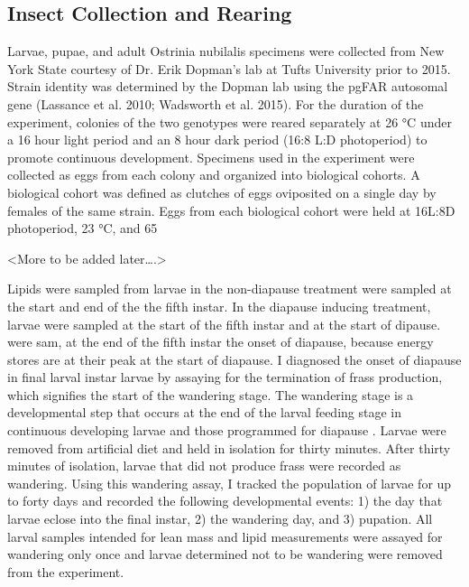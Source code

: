 \documentclass[review]{elsarticle}
\begin{document}
\subsection{Insect Collection and Rearing}
Larvae, pupae, and adult Ostrinia nubilalis specimens were collected from New York State courtesy of Dr. Erik Dopman's lab at Tufts University prior to 2015. Strain identity was determined by the Dopman lab using the pgFAR autosomal gene (Lassance et al. 2010; Wadsworth et al. 2015). For the duration of the experiment, colonies of the two genotypes were reared separately at 26 °C under a 16 hour light period and an 8 hour dark period (16:8 L:D photoperiod) to promote continuous development. 
Specimens used in the experiment  were collected as eggs from each colony and organized into biological cohorts. A biological cohort was defined as clutches of eggs oviposited on a single day by females of the same strain. Eggs from each biological cohort were held at 16L:8D photoperiod, 23 °C, and 65%

<More to be added later….>


Lipids were sampled from larvae in the non-diapause treatment were sampled at the start and end of the the fifth instar. In the diapause inducing treatment, larvae were sampled at the start of the fifth instar and at the start of dipause. were sam, at the end of the fifth instar  the onset of diapause, because energy stores are at their peak at the start of diapause. I diagnosed the onset of diapause in final larval instar larvae by assaying for the termination of frass production, which signifies the start of the wandering stage. The wandering stage is a developmental step that occurs at the end of the larval feeding stage in continuous developing larvae and those programmed for diapause \citep{Sakurai1998}. Larvae were removed from artificial diet and held in isolation for thirty minutes. After thirty minutes of isolation, larvae that did not produce frass were recorded as wandering. Using this wandering assay, I tracked the population of larvae for up to forty days and recorded the following developmental events: 1) the day that larvae eclose into the final instar, 2) the wandering day, and 3) pupation. All larval samples intended for lean mass and lipid measurements were assayed for wandering only once and larvae determined not to be wandering were removed from the experiment. 
\end{document}
